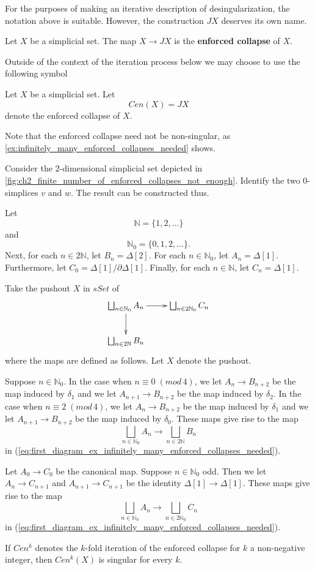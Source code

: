 For the purposes of making an iterative description of desingularization, the notation above is suitable. However, the construction $JX$ deserves its own name.
\begin{definition}\label{def:enforced_collapse}
Let $X$ be a simplicial set. The map $X\to JX$ is the \textbf{enforced collapse} of $X$.
\end{definition}
\noindent Outside of the context of the iteration process below we may choose to use the following symbol
\begin{notation}
Let $X$ be a simplicial set. Let
\[Cen(X)=JX\]
denote the enforced collapse of $X$.
\end{notation}
\noindent Note that the enforced collapse need not be non-singular, as \cref{ex:infinitely_many_enforced_collapses_needed} shows.
\begin{example}\label{ex:infinitely_many_enforced_collapses_needed}
Consider the $2$-dimensional simplicial set depicted in \cref{fig:ch2_finite_number_of_enforced_collapses_not_enough}. Identify the two $0$-simplices $v$ and $w$. The result can be constructed thus.

Let
\[\mathbb{N} =\{ 1,2,\dots \}\]
and
\[\mathbb{N} _0=\{ 0,1,2,\dots \} .\]
Next, for each $n\in 2\mathbb{N}$, let $B_n=\Delta [2]$. For each $n\in \mathbb{N} _0$, let $A_n=\Delta [1]$. Furthermore, let $C_0=\Delta [1]/\partial \Delta [1]$. Finally, for each $n\in \mathbb{N}$, let $C_n=\Delta [1]$.

Take the pushout $X$ in $sSet$ of
\begin{equation}
\label{eq:first_diagram_ex_infinitely_many_enforced_collapses_needed}
\begin{gathered}
\xymatrix{
\bigsqcup _{n\in \mathbb{N} _0}A_n \ar[d] \ar[r] & \bigsqcup _{n\in 2\mathbb{N} _0}C_n \\
\bigsqcup _{n\in 2\mathbb{N} }B_n
}
\end{gathered}
\end{equation}
where the maps are defined as follows. Let $X$ denote the pushout.

Suppose $n\in \mathbb{N} _0$. In the case when $n\equiv 0\; (mod\, 4)$, we let $A_n\to B_{n+2}$ be the map induced by $\delta _1$ and we let $A_{n+1}\to B_{n+2}$ be the map induced by $\delta _2$. In the case when $n\equiv 2\; (mod\, 4)$, we let $A_n\to B_{n+2}$ be the map induced by $\delta _1$ and we let $A_{n+1}\to B_{n+2}$ be the map induced by $\delta _0$. These maps give rise to the map
\[\bigsqcup _{n\in \mathbb{N} _0}A_n\to \bigsqcup _{n\in 2\mathbb{N} }B_n\]
in (\ref{eq:first_diagram_ex_infinitely_many_enforced_collapses_needed}).

Let $A_0\to C_0$ be the canonical map. Suppose $n\in \mathbb{N} _0$ odd. Then we let $A_n\to C_{n+1}$ and $A_{n+1}\to C_{n+1}$ be the identity $\Delta [1]\to \Delta [1]$. These maps give rise to the map
\[\bigsqcup _{n\in \mathbb{N} _0}A_n\to \bigsqcup _{n\in 2\mathbb{N} _0}C_n\]
in (\ref{eq:first_diagram_ex_infinitely_many_enforced_collapses_needed}).

If $Cen^k$ denotes the $k$-fold iteration of the enforced collapse for $k$ a non-negative integer, then $Cen^k(X)$ is singular for every $k$.
\end{example}
